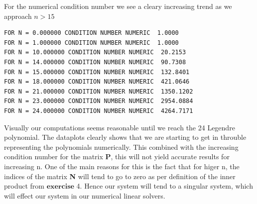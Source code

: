\documentclass[a4paper,norsk]{article}
\begin{document}
For the numerical condition number we see a cleary increasing trend as we approach $n > 15$
\begin{lstlisting}[style=terminal]
FOR N = 0.000000 CONDITION NUMBER NUMERIC  1.0000
FOR N = 1.000000 CONDITION NUMBER NUMERIC  1.0000
FOR N = 10.000000 CONDITION NUMBER NUMERIC  20.2153
FOR N = 14.000000 CONDITION NUMBER NUMERIC  90.7308
FOR N = 15.000000 CONDITION NUMBER NUMERIC  132.8401
FOR N = 18.000000 CONDITION NUMBER NUMERIC  421.0646
FOR N = 21.000000 CONDITION NUMBER NUMERIC  1350.1202
FOR N = 23.000000 CONDITION NUMBER NUMERIC  2954.0884
FOR N = 24.000000 CONDITION NUMBER NUMERIC  4264.7171
\end{lstlisting}

Visually our computations seems reasonable until we reach the 24 Legendre polynomial. The dataplots clearly shows that we are starting to get in throuble representing the polynomials numerically. This combined with the increasing condition number for the matrix \textbf{P}, this will not yield accurate results for increasing n. One of the main reasons for this is the fact that for higer n, the indices of the matrix \textbf{N} will tend to go to zero as per definition of the inner product from 
$\mathbf{exercise}$ 4. Hence our system will tend to a singular system, which will effect our system in our numerical linear solvers.
\end{document}
